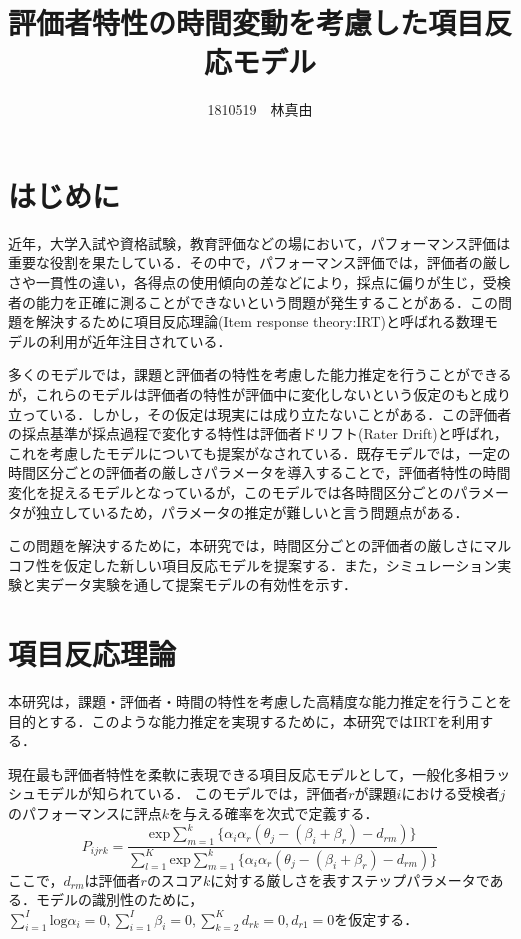 \documentclass[dvipdfmx, twocolumn, a4paper]{hcresume}
\title{\bf 評価者特性の時間変動を考慮した項目反応モデル}
\author{1810519　林真由}
\begin{document}
\maketitle
\pagestyle{empty}
\thispagestyle{empty}
\section{はじめに}
近年，大学入試や資格試験，教育評価などの場において，パフォーマンス評価は重要な役割を果たしている．その中で，パフォーマンス評価では，評価者の厳しさや一貫性の違い，各得点の使用傾向の差などにより，採点に偏りが生じ，受検者の能力を正確に測ることができないという問題が発生することがある．この問題を解決するために項目反応理論(Item response theory:IRT)\cite{IRTLord}と呼ばれる数理モデルの利用が近年注目されている．

多くのモデルでは，課題と評価者の特性を考慮した能力推定を行うことができるが，これらのモデルは評価者の特性が評価中に変化しないという仮定のもと成り立っている．しかし，その仮定は現実には成り立たないことがある．この評価者の採点基準が採点過程で変化する特性は評価者ドリフト(Rater Drift)と呼ばれ，これを考慮したモデルについても提案がなされている．既存モデルでは，一定の時間区分ごとの評価者の厳しさパラメータを導入することで，評価者特性の時間変化を捉えるモデルとなっているが，このモデルでは各時間区分ごとのパラメータが独立しているため，パラメータの推定が難しいと言う問題点がある．

この問題を解決するために，本研究では，時間区分ごとの評価者の厳しさにマルコフ性を仮定した新しい項目反応モデルを提案する．また，シミュレーション実験と実データ実験を通して提案モデルの有効性を示す．

\section{項目反応理論}
本研究は，課題・評価者・時間の特性を考慮した高精度な能力推定を行うことを目的とする．このような能力推定を実現するために，本研究ではIRTを利用する．

現在最も評価者特性を柔軟に表現できる項目反応モデルとして，一般化多相ラッシュモデルが知られている\cite{g-MFRM}．
このモデルでは，評価者$r$が課題$i$における受検者$j$のパフォーマンスに評点$k$を与える確率を次式で定義する．
\begin{displaymath}
  P_{ijrk}=\frac{\mathrm{exp}\sum_{m=1}^{k}\{\alpha_i\alpha_r(\theta_{j}-(\beta_{i}+\beta_{r})-d_{rm})\}}{\sum_{l=1}^{K}\mathrm{exp}\sum_{m=1}^{k}\{\alpha_i\alpha_r(\theta_{j}-(\beta_{i}+\beta_{r})-d_{rm})\}}
\end{displaymath}
ここで，$d_{rm}$は評価者$r$のスコア$k$に対する厳しさを表すステップパラメータである．モデルの識別性のために，$\sum^{I}_{i=1}{\mathrm{log}\alpha_i}=0,\sum^{I}_{i=1}{\beta_i}=0,\sum^{K}_{k=2}{d_{rk}}=0, d_{r1}=0$を仮定する．
\end{document}
